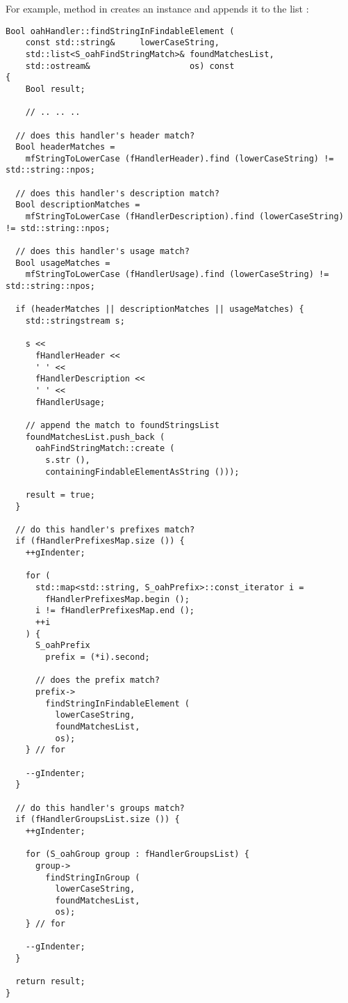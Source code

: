 For example, method  in  creates an instance and appends it to the list :
\begin{lstlisting}[language=Terminal]
Bool oahHandler::findStringInFindableElement (
	const std::string&     lowerCaseString,
	std::list<S_oahFindStringMatch>& foundMatchesList,
	std::ostream&                    os) const
{
	Bool result;

	// .. .. ..

  // does this handler's header match?
  Bool headerMatches =
    mfStringToLowerCase (fHandlerHeader).find (lowerCaseString) != std::string::npos;

  // does this handler's description match?
  Bool descriptionMatches =
    mfStringToLowerCase (fHandlerDescription).find (lowerCaseString) != std::string::npos;

  // does this handler's usage match?
  Bool usageMatches =
    mfStringToLowerCase (fHandlerUsage).find (lowerCaseString) != std::string::npos;

  if (headerMatches || descriptionMatches || usageMatches) {
    std::stringstream s;

    s <<
      fHandlerHeader <<
      ' ' <<
      fHandlerDescription <<
      ' ' <<
      fHandlerUsage;

    // append the match to foundStringsList
    foundMatchesList.push_back (
      oahFindStringMatch::create (
        s.str (),
        containingFindableElementAsString ()));

    result = true;
  }

  // do this handler's prefixes match?
  if (fHandlerPrefixesMap.size ()) {
    ++gIndenter;

    for (
      std::map<std::string, S_oahPrefix>::const_iterator i =
        fHandlerPrefixesMap.begin ();
      i != fHandlerPrefixesMap.end ();
      ++i
    ) {
      S_oahPrefix
        prefix = (*i).second;

      // does the prefix match?
      prefix->
        findStringInFindableElement (
          lowerCaseString,
          foundMatchesList,
          os);
    } // for

    --gIndenter;
  }

  // do this handler's groups match?
  if (fHandlerGroupsList.size ()) {
    ++gIndenter;

    for (S_oahGroup group : fHandlerGroupsList) {
      group->
        findStringInGroup (
          lowerCaseString,
          foundMatchesList,
          os);
    } // for

    --gIndenter;
  }

  return result;
}
\end{lstlisting}

